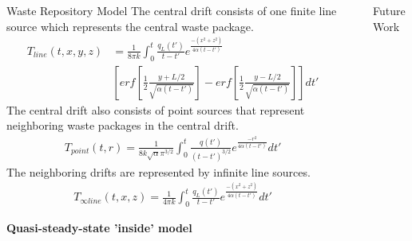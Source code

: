 \documentclass[final]{beamer}
\newlength{\sepwid}
\newlength{\onecolwid}
\newlength{\threecolwid}
\begin{document}
\begin{frame}[t]
\begin{columns}[t,totalwidth=\threecolwid]
\begin{column}{\onecolwid}
\begin{block}{Waste Repository Model}
The central drift consists of one finite line source which represents the central 
waste package. 
\begin{align*}
	T_{line}(t,x,y,z) &= \frac{1}{8 \pi k}  \int_{0}^{t} \frac{q_L(t')}{t-t'}e^{\frac{-(x^2+z^2)}{4\alpha(t-t')}} \\
	&[erf[\frac{1}{2}\frac{y+L/2}{\sqrt{\alpha(t-t')}}]-erf[\frac{1}{2}\frac{y-L/2}{\sqrt{\alpha(t-t')}}]] dt'
\end{align*}
The central drift also consists of point sources that represent neighboring 
waste packages in the central drift. 
\begin{align*}
	T_{point}(t,r) = \frac{1}{8 k \sqrt{\alpha} \pi^{3/2}} \int_{0}^{t}\frac{q(t')}{(t-t')^{3/2}}e^{\frac{-r^2}{4\alpha(t-t')}}dt'
\end{align*}
The neighboring drifts are represented by infinite line sources.  
\begin{align*}
	T_{\infty line}(t,x,z) = \frac{1}{4\pi k} \int_0^t \frac{q_L(t')}{t-t'} e^{\frac{-(x^2+z^2)}{4\alpha (t-t')}} dt'
\end{align*}

\textbf{Quasi-steady-state 'inside' model}

\end{block}



\end{column} %

\begin{column}{\sepwid}\end{column} %

\begin{column}{\onecolwid} %
	

\begin{alertblock}{Future Work}


\end{alertblock}







\end{column}
\end{columns}
\end{frame}
\end{document}
